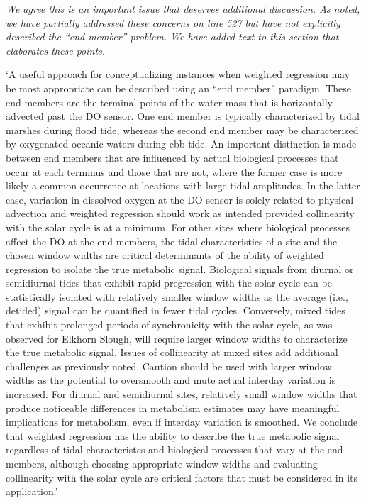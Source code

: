 \documentclass[letterpaper,12pt]{article}\usepackage[]{graphicx}\usepackage[]{color}
\begin{document}
{\it We agree this is an important issue that deserves additional discussion.  As noted, we have partially addressed these concerns on line 527 but have not explicitly described the ``end member'' problem.  We have added text to this section that elaborates these points. 

`A useful approach for conceptualizing instances when weighted regression may be most appropriate can be described using an ``end member'' paradigm.  These end members are the terminal points of the water mass that is horizontally advected past the DO sensor.  One end member is typically characterized by tidal marshes during flood tide, whereas the second end member may be characterized by oxygenated oceanic waters during ebb tide.  An important distinction is made between end members that are influenced by actual biological processes that occur at each terminus and those that are not, where the former case is more likely a common occurrence at locations with large tidal amplitudes.  In the latter case, variation in dissolved oxygen at the DO sensor is solely related to physical advection and weighted regression should work as intended provided collinearity with the solar cycle is at a minimum.  For other sites where biological processes affect the DO at the end members, the tidal characteristics of a site and the chosen window widths are critical determinants of the ability of weighted regression to isolate the true metabolic signal.  Biological signals from diurnal or semidiurnal tides that exhibit rapid pregression with the solar cycle can be statistically isolated with relatively smaller window widths as the average (i.e., detided) signal can be quantified in fewer tidal cycles.  Conversely, mixed tides that exhibit prolonged periods of synchronicity with the solar cycle, as was observed for Elkhorn Slough, will require larger window widths to characterize the true metabolic signal.  Issues of collinearity at mixed sites add additional challenges as previously noted.  Caution should be used with larger window widths as the potential to oversmooth and mute actual interday variation is increased.  For diurnal and semidiurnal sites, relatively small window widths that produce noticeable differences in metabolism estimates may have meaningful implications for metabolism, even if interday variation is smoothed.  We conclude that weighted regression has the ability to describe the true metabolic signal regardless of tidal characteristcs and biological processes that vary at the end members, although choosing appropriate window widths and evaluating collinearity with the solar cycle are critical factors that must be considered in its application.'
}
\end{document}
